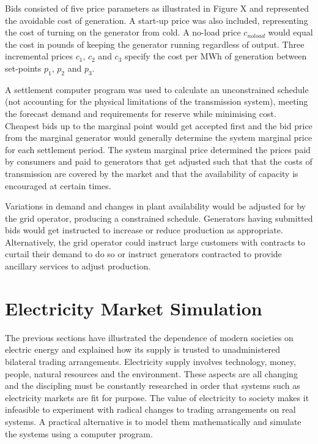 
Bids consisted of five price parameters as illustrated in Figure X and
represented the avoidable cost of generation.  A start-up price was also
included, representing the cost of turning on the generator from cold.  A
no-load price $c_{noload}$ would equal the cost in pounds of keeping the
generator running regardless of output. Three incremental prices $c_1$, $c_2$
and $c_3$ specify the cost per MWh of generation between set-points $p_1$,
$p_2$ and $p_3$.

A settlement computer program was used to calculate an unconstrained schedule
(not accounting for the physical limitations of the transmission system),
meeting the forecast demand and requirements for reserve while minimising cost.
Cheapest bids up to the marginal point would get accepted first and the bid
price from the marginal generator would generally determine the system marginal
price for each settlement period.  The system marginal price determined the
prices paid by consumers and paid to generators that get adjusted such that
that the costs of transmission are covered by the market and that the
availability of capacity is encouraged at certain times.

Variations in demand and changes in plant availability would be adjusted for by
the grid operator, producing a constrained schedule.  Generators having
submitted bids would get instructed to increase or reduce production as
appropriate.  Alternatively, the grid operator could instruct large customers
with contracts to curtail their demand to do so or instruct generators
contracted to provide ancillary services to adjust production.

\section{Electricity Market Simulation}
The previous sections have illustrated the dependence of modern societies on
electric energy and explained how its supply is trusted to unadministered
bilateral trading arrangements.  Electricity supply involves technology, money,
people, natural resources and the environment.  These aspects are all changing
and the discipling must be constantly researched in order that systems such as
electricity markets are fit for purpose.  The value of electricity to society
makes it infeasible to experiment with radical changes to trading arrangements
on real systems.  A practical alternative is to model them mathematically and
simulate the systems using a computer program.


